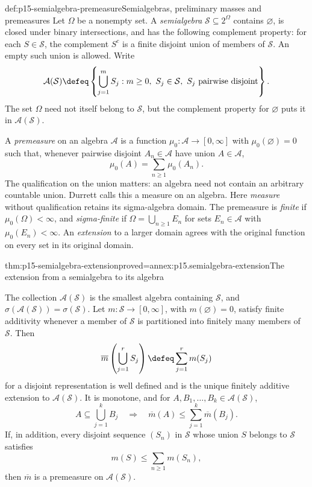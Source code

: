 \begin{hbdefinition}{def:p15-semialgebra-premeasure}{Semialgebras, preliminary masses and premeasures}
Let \(\Omega\) be a nonempty set. A \emph{semialgebra}
\(\mathcal S\subseteq2^\Omega\) contains \(\varnothing\), is closed
under binary intersections, and has the following complement property:
for each \(S\in\mathcal S\), the complement \(S^c\) is a finite
disjoint union of members of \(\mathcal S\). An empty such union is
allowed. Write
\[
 \mathcal A(\mathcal S)\defeq
 \left\{\bigcup_{j=1}^m S_j:m\geq0,\ S_j\in\mathcal S,
                        \ S_j\text{ pairwise disjoint}\right\}.
\]
The set \(\Omega\) need not itself belong to \(\mathcal S\), but
the complement property for \(\varnothing\) puts it in
\(\mathcal A(\mathcal S)\).

A \emph{premeasure} on an algebra \(\mathcal A\) is a function
\(\mu_0:\mathcal A\to[0,\infty]\) with \(\mu_0(\varnothing)=0\)
such that, whenever pairwise disjoint \(A_n\in\mathcal A\) have
union \(A\in\mathcal A\),
\[
 \mu_0(A)=\sum_{n\geq1}\mu_0(A_n).
\]
The qualification on the union matters: an algebra need not contain an
arbitrary countable union. Durrett calls this a measure on an algebra.
Here \emph{measure} without qualification retains its sigma-algebra domain.
The premeasure is \emph{finite} if \(\mu_0(\Omega)<\infty\), and
\emph{sigma-finite} if \(\Omega=\bigcup_{n\geq1}E_n\) for sets
\(E_n\in\mathcal A\) with \(\mu_0(E_n)<\infty\).
An \emph{extension} to a larger domain agrees with the original function
on every set in its original domain.
\end{hbdefinition}

\begin{hbtheorem}{thm:p15-semialgebra-extension}{proved=annex:p15.semialgebra-extension}{The extension from a semialgebra to its algebra}
\par\nobreak
The collection \(\mathcal A(\mathcal S)\) is the smallest algebra
containing \(\mathcal S\), and
\(\sigma(\mathcal A(\mathcal S))=\sigma(\mathcal S)\).
Let \(m:\mathcal S\to[0,\infty]\), with \(m(\varnothing)=0\),
satisfy finite additivity whenever a member of \(\mathcal S\) is
partitioned into finitely many members of \(\mathcal S\). Then
\[
 \overline m\left(\bigcup_{j=1}^r S_j\right)
       \defeq\sum_{j=1}^r m(S_j)
\]
for a disjoint representation is well defined and is the unique finitely
additive extension to \(\mathcal A(\mathcal S)\). It is monotone,
and for \(A,B_1,\ldots,B_k\in\mathcal A(\mathcal S)\),
\[
 A\subseteq\bigcup_{j=1}^k B_j
       \quad\Longrightarrow\quad
 \overline m(A)\leq\sum_{j=1}^k\overline m(B_j).
\]
If, in addition, every disjoint sequence \((S_n)\) in \(\mathcal S\)
whose union \(S\) belongs to \(\mathcal S\) satisfies
\[
 m(S)\leq\sum_{n\geq1}m(S_n),
\]
then \(\overline m\) is a premeasure on \(\mathcal A(\mathcal S)\).
\end{hbtheorem}

